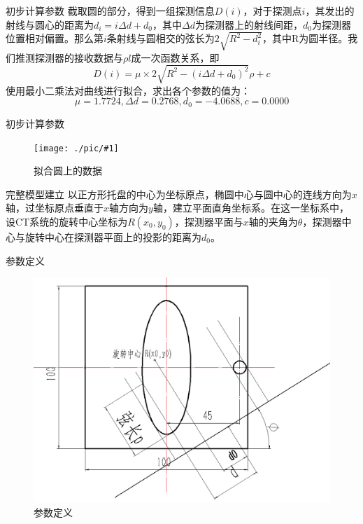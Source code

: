 \documentclass{beamer}
\newcommand{\maxpic}[2]{  \begin{figure}[H]
  \centering
  \texttt{[image: ./pic/\#1]}\\
  \caption{#2}
\end{figure}}
\begin{document}
  \begin{frame}{初步计算参数}
    截取圆的部分，得到一组探测信息\(D(i)\)，对于探测点\(i\)，其发出的射线与圆心的距离为\(d_i = i\Delta d + d_0\)，其中\(\Delta d\)为探测器上的射线间距，\(d_0\)为探测器位置相对偏置。那么第\(i\)条射线与圆相交的弦长为\(2\sqrt{R^2 - d_i^2}\)，其中R为圆半径。我们推测探测器的接收数据与\(\rho l\)成一次函数关系，即
    \begin{equation}
      D(i)  = \mu\times 2\sqrt{R^2 - ( i\Delta d + d_0)^2}\rho  +c
    \end{equation}
      使用最小二乘法对曲线进行拟合，求出各个参数的值为：
      \[\mu =1.7724 , \Delta d = 0.2768, d_0 = -4.0688, c = 0.0000\]
  \end{frame}
 
  \begin{frame}{初步计算参数}
    \maxpic{fitCir.png}{拟合圆上的数据}
  \end{frame}

  \begin{frame}{完整模型建立}
    以正方形托盘的中心为坐标原点，椭圆中心与圆中心的连线方向为\(x\)轴，过坐标原点垂直于\(x\)轴方向为\(y\)轴，建立平面直角坐标系。在这一坐标系中，设CT系统的旋转中心坐标为\(R(x_0,y_0)\)，探测器平面与\(x\)轴的夹角为\(\theta\)，探测器中心与旋转中心在探测器平面上的投影的距离为\(d_0\)。
    
  \end{frame}
  
  \begin{frame}{参数定义}
    \begin{figure}
      \begin{center}
        \includegraphics[scale=0.3]{pic/q13.png}
      \end{center}
      \caption{参数定义}
      \label{Fig:xian}
    \end{figure}
  \end{frame}
\end{document}
